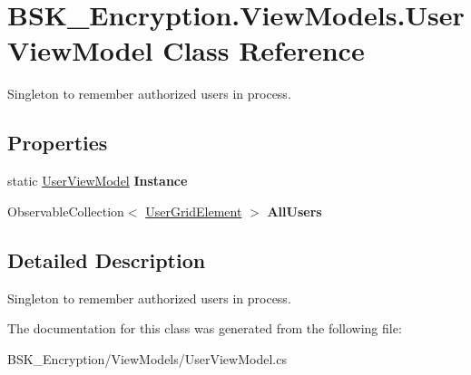 \hypertarget{class_b_s_k___encryption_1_1_view_models_1_1_user_view_model}{}\section{B\+S\+K\+\_\+\+Encryption.\+View\+Models.\+User\+View\+Model Class Reference}
\label{class_b_s_k___encryption_1_1_view_models_1_1_user_view_model}


Singleton to remember authorized users in process.  


\subsection*{Properties}
\begin{DoxyCompactItemize}
\item 
\mbox{\label{class_b_s_k___encryption_1_1_view_models_1_1_user_view_model_aa1f873290abb17312273776823dd5723}} 
static \mbox{\hyperlink{class_b_s_k___encryption_1_1_view_models_1_1_user_view_model}{User\+View\+Model}} {\bfseries Instance}
\item 
\mbox{\label{class_b_s_k___encryption_1_1_view_models_1_1_user_view_model_ac7ac65701eccd6a6f03e2f59817bf8ca}} 
Observable\+Collection$<$ \mbox{\hyperlink{class_b_s_k___encryption_1_1_view_models_1_1_user_grid_element}{User\+Grid\+Element}} $>$ {\bfseries All\+Users}
\end{DoxyCompactItemize}


\subsection{Detailed Description}
Singleton to remember authorized users in process. 



The documentation for this class was generated from the following file\+:\begin{DoxyCompactItemize}
\item 
B\+S\+K\+\_\+\+Encryption/\+View\+Models/User\+View\+Model.\+cs\end{DoxyCompactItemize}
